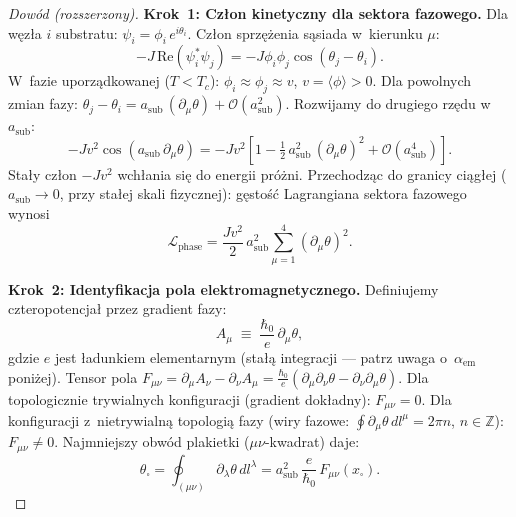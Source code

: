 \begin{proof}[Dowód (rozszerzony)]
\textbf{Krok~1: Człon kinetyczny dla sektora fazowego.}
Dla węzła $i$ substratu: $\psi_i = \phi_i\,e^{i\theta_i}$.
Człon sprzężenia sąsiada w~kierunku $\mu$:
\begin{equation}\label{eq:kinetic-step1}
    -J\,\mathrm{Re}(\psi_i^*\psi_j)
    = -J\phi_i\phi_j\cos(\theta_j - \theta_i).
\end{equation}
W~fazie uporządkowanej ($T < T_c$): $\phi_i \approx \phi_j \approx v$,
$v = \langle\phi\rangle > 0$. Dla powolnych zmian fazy:
$\theta_j - \theta_i = a_{\mathrm{sub}}\,(\partial_\mu\theta) + \mathcal{O}(a_{\mathrm{sub}}^2)$.
Rozwijamy do drugiego rzędu w~$a_{\mathrm{sub}}$:
\begin{equation}\label{eq:kinetic-step2}
    -Jv^2\cos(a_{\mathrm{sub}}\,\partial_\mu\theta)
    = -Jv^2\!\left[1 - \tfrac{1}{2}\,a_{\mathrm{sub}}^2\,(\partial_\mu\theta)^2
      + \mathcal{O}(a_{\mathrm{sub}}^4)\right].
\end{equation}
Stały człon $-Jv^2$ wchłania się do energii próżni.
Przechodząc do granicy ciągłej ($a_{\mathrm{sub}} \to 0$, przy stałej
skali fizycznej): gęstość Lagrangiana sektora fazowego wynosi
\begin{equation}\label{eq:Lphase}
    \mathcal{L}_{\mathrm{phase}}
    = \frac{Jv^2}{2}\,a_{\mathrm{sub}}^{2}\sum_{\mu = 1}^{4}(\partial_\mu\theta)^2.
\end{equation}

\textbf{Krok~2: Identyfikacja pola elektromagnetycznego.}
Definiujemy czteropotencjał przez gradient fazy:
\begin{equation}\label{eq:Amu-from-theta}
    A_\mu \;\equiv\; \frac{\hbar_0}{e}\,\partial_\mu\theta,
\end{equation}
gdzie $e$ jest ładunkiem elementarnym (stałą integracji --- patrz uwaga
o~$\alpha_{\mathrm{em}}$ poniżej).
Tensor pola $F_{\mu\nu} = \partial_\mu A_\nu - \partial_\nu A_\mu
= \frac{\hbar_0}{e}(\partial_\mu\partial_\nu\theta
- \partial_\nu\partial_\mu\theta)$.
Dla topologicznie trywialnych konfiguracji (gradient dokładny):
$F_{\mu\nu} = 0$. Dla konfiguracji z~nietrywialną topologią fazy
(wiry fazowe: $\oint\partial_\mu\theta\,dl^\mu = 2\pi n$, $n\in\mathbb{Z}$):
$F_{\mu\nu} \neq 0$. Najmniejszy obwód plakietki ($\mu\nu$-kwadrat)
daje:
\begin{equation}\label{eq:plaquette}
    \theta_\square
    = \oint_{(\mu\nu)} \partial_\lambda\theta\,dl^\lambda
    = a_{\mathrm{sub}}^2\,\frac{e}{\hbar_0}\,F_{\mu\nu}(x_\square).
\end{equation}


\end{proof}
